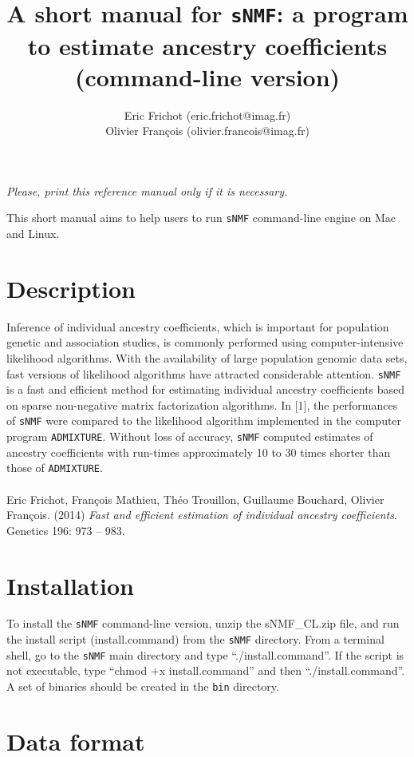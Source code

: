 \documentclass[10pt,a4paper]{article}
\title{\bf \Large A short manual for {\tt sNMF}:
a program to estimate ancestry coefficients\\
\large (command-line version)
}
\author{
        Eric Frichot (eric.frichot@imag.fr)\\
        Olivier François (olivier.francois@imag.fr)\\
}
\begin{document}
\maketitle
\begin{center}
{\it Please, print this reference manual only if it is necessary.}
\end{center}

\noindent
This short manual aims to help users to run {\tt sNMF} command-line engine on Mac and Linux. 

\section{Description} 
Inference of individual ancestry coefficients, which is important for population genetic and association studies, is commonly performed using computer-intensive likelihood algorithms. With the availability of large population genomic data sets, fast versions of likelihood algorithms have attracted considerable attention. 
\noindent
{\tt sNMF} is a fast and efficient method for estimating individual ancestry coefficients based on sparse non-negative matrix factorization algorithms. In [1], the performances of {\tt sNMF} were compared to the likelihood algorithm implemented in the computer program {\tt ADMIXTURE}.  Without loss of accuracy, {\tt sNMF} computed estimates of ancestry coefficients with run-times approximately 10 to 30 times shorter than those of {\tt ADMIXTURE}.
\\
\\
\noindent
[1] Eric Frichot, François Mathieu, Théo Trouillon, Guillaume Bouchard, Olivier François. (2014) {\it Fast and efficient estimation of individual ancestry coefficients}. Genetics 196: 973 -- 983. 

\section{Installation} 

\noindent
To install the {\tt sNMF} command-line version, unzip the sNMF\_CL.zip file, and run the 
install script (install.command) from the {\tt sNMF} directory.
From a terminal shell, go to the {\tt sNMF} main directory and type ``./install.command''.
If the script is not executable, type ``chmod +x install.command'' and then ``./install.command''.
A set of binaries should be created in the {\tt bin} directory.

\section{Data format}
\end{document}
